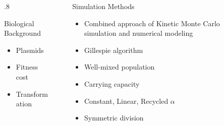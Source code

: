 \documentclass[final]{beamer}
\newlength{\sepwid}
\newlength{\onecolwid}
\begin{document}
\begin{frame}[t]
\begin{block}
\begin{columns}[t]
\begin{column}{\sepwid}\end{column} %

\begin{column}{.8\onecolwid}
  \begin{alertblock}{Biological Background}
    \begin{itemize}
      \item Plasmids
      \item Fitness cost
      \item Transformation
    \end{itemize}
  \end{alertblock}
\end{column}

\begin{column}{\sepwid}\end{column} %

\begin{column}{\onecolwid}
  \begin{alertblock}{Simulation Methods}
    \begin{itemize}
      \item Combined approach of Kinetic Monte Carlo simulation and numerical modeling
      \item Gillespie algorithm
      \item Well-mixed population
      \item Carrying capacity
      \item Constant, Linear, Recycled $\alpha$
      \item Symmetric division
    \end{itemize}
  \end{alertblock}
\end{column}
\end{columns} %
\end{block}


\begin{block}


\end{block}
\end{frame}
\end{document}
